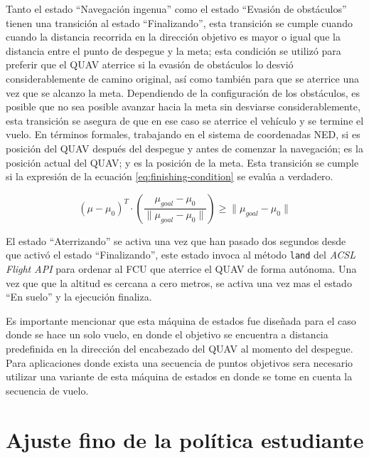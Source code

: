 Tanto el estado ``Navegación ingenua'' como el estado ``Evasión de obstáculos'' tienen una transición al estado ``Finalizando'', esta transición se cumple cuando cuando la distancia recorrida en la dirección objetivo es mayor o igual que la distancia entre el punto de despegue y la meta; esta condición se utilizó para preferir que el QUAV aterrice si la evasión de obstáculos lo desvió considerablemente de camino original, así como también para que se aterrice una vez que se alcanzo la meta. Dependiendo de la configuración de los obstáculos, es posible que no sea posible avanzar hacia la meta sin desviarse considerablemente, esta transición se asegura de que en ese caso se aterrice el vehículo y se termine el vuelo. En términos formales, trabajando en el sistema de coordenadas NED, si  es posición del QUAV después del despegue y antes de comenzar la navegación; \jim{\mu} es la posición actual del QUAV; y  es la posición de la meta. Esta transición se cumple si la expresión de la ecuación \ref{eq:finishing-condition} se evalúa a verdadero.

\begin{equation}
    \label{eq:finishing-condition}
    (\mu - \mu_0)^T \cdot \left (\frac{\mu_{goal} - \mu_0}{\|\mu_{goal} - \mu_0\|}  \right) \geq \|\mu_{goal} - \mu_0\|
\end{equation}

El estado ``Aterrizando'' se activa una vez que han pasado dos segundos desde que activó el estado ``Finalizando'', este estado invoca al método \texttt{land} del \textit{ACSL Flight API} para ordenar al FCU que aterrice el QUAV de forma autónoma. Una vez que que la altitud es cercana a cero metros, se activa una vez mas el estado ``En suelo'' y la ejecución finaliza.

Es importante mencionar que esta máquina de estados fue diseñada para el caso donde se hace un solo vuelo, en donde el objetivo se encuentra a distancia predefinida en la dirección del encabezado del QUAV al momento del despegue. Para aplicaciones donde exista una secuencia de puntos objetivos sera necesario utilizar una variante de esta máquina de estados en donde se tome en cuenta la secuencia de vuelo. 

\section{Ajuste fino de la política estudiante}

\label{sec:imp-finetune}

